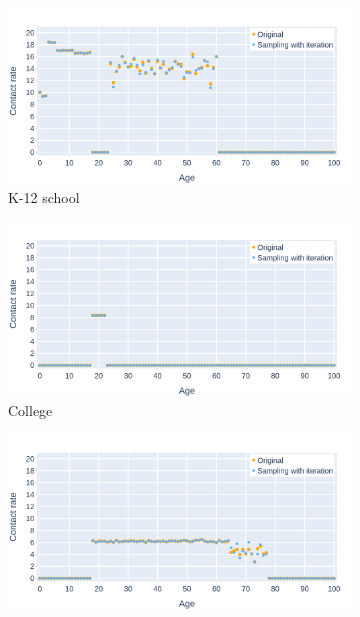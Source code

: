 \begin{figure}
    \centering
    \begin{subfigure}{.8\linewidth}
        \centering
        \includegraphics[width=\textwidth]{4 - Sampling/fig/sampling_with_iteration/swi_1sample_vs_standard_reverse_cr_k12school.png}
        \caption{K-12 school}
        \label{fig:swi_1sample_vs_standard_reversed_cr_k12school}
    \end{subfigure}
    \begin{subfigure}{.8\linewidth}
        \centering
        \includegraphics[width=\textwidth]{4 - Sampling/fig/sampling_with_iteration/swi_1sample_vs_standard_reverse_cr_college.png}
        \caption{College}
        \label{fig:swi_1sample_vs_standard_reversed_cr_college}
    \end{subfigure}
    \begin{subfigure}{.8\linewidth}
        \centering
        \includegraphics[width=\textwidth]{4 - Sampling/fig/sampling_with_iteration/swi_1sample_vs_standard_reverse_cr_workplace.png}

\end{subfigure}
\end{figure}
